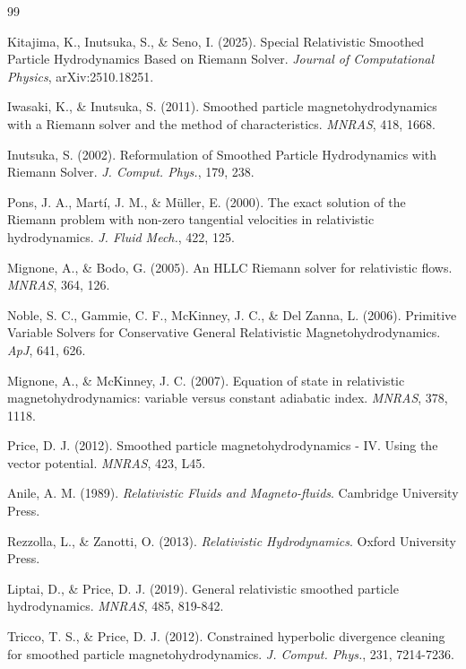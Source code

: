 \documentclass[12pt,a4paper]{article}
\begin{document}
\begin{thebibliography}{99}

 Kitajima, K., Inutsuka, S., \& Seno, I. (2025).
Special Relativistic Smoothed Particle Hydrodynamics Based on Riemann Solver.
\textit{Journal of Computational Physics}, arXiv:2510.18251.

 Iwasaki, K., \& Inutsuka, S. (2011).
Smoothed particle magnetohydrodynamics with a Riemann solver and the method of characteristics.
\textit{MNRAS}, 418, 1668.

 Inutsuka, S. (2002).
Reformulation of Smoothed Particle Hydrodynamics with Riemann Solver.
\textit{J. Comput. Phys.}, 179, 238.

 Pons, J. A., Mart\'i, J. M., \& M\"uller, E. (2000).
The exact solution of the Riemann problem with non-zero tangential velocities in relativistic hydrodynamics.
\textit{J. Fluid Mech.}, 422, 125.

 Mignone, A., \& Bodo, G. (2005).
An HLLC Riemann solver for relativistic flows.
\textit{MNRAS}, 364, 126.

 Noble, S. C., Gammie, C. F., McKinney, J. C., \& Del Zanna, L. (2006).
Primitive Variable Solvers for Conservative General Relativistic Magnetohydrodynamics.
\textit{ApJ}, 641, 626.

 Mignone, A., \& McKinney, J. C. (2007).
Equation of state in relativistic magnetohydrodynamics: variable versus constant adiabatic index.
\textit{MNRAS}, 378, 1118.

 Price, D. J. (2012).
Smoothed particle magnetohydrodynamics - IV. Using the vector potential.
\textit{MNRAS}, 423, L45.

 Anile, A. M. (1989).
\textit{Relativistic Fluids and Magneto-fluids}.
Cambridge University Press.

 Rezzolla, L., \& Zanotti, O. (2013).
\textit{Relativistic Hydrodynamics}.
Oxford University Press.

 Liptai, D., \& Price, D. J. (2019).
General relativistic smoothed particle hydrodynamics.
\textit{MNRAS}, 485, 819-842.

 Tricco, T. S., \& Price, D. J. (2012).
Constrained hyperbolic divergence cleaning for smoothed particle magnetohydrodynamics.
\textit{J. Comput. Phys.}, 231, 7214-7236.


\end{thebibliography}
\end{document}
